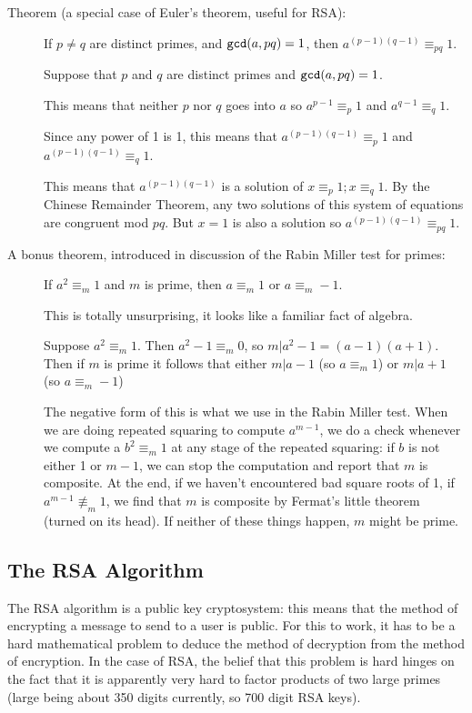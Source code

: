 \documentclass[12pt]{article}
\begin{document}
\begin{description}

\item[Theorem (a special case of Euler's theorem, useful for RSA):]  If $p \neq q$ are distinct primes,
and ${\tt gcd}(a,pq)=1$, then $a^{(p-1)(q-1)} \equiv_{pq} 1$.

Suppose that $p$ and $q$ are distinct primes and ${\tt gcd}(a,pq)=1$.  

This means that neither $p$ nor $q$ goes into $a$ so $a^{p-1} \equiv_p 1$ and $a^{q-1} \equiv_q 1$.

Since any power of 1 is 1, this means that $a^{(p-1)(q-1)} \equiv_{p} 1$ and $a^{(p-1)(q-1)} \equiv_{q} 1$.

This means that $a^{(p-1)(q-1)}$ is a solution of $x \equiv_p 1;x \equiv_q 1$.  By the Chinese Remainder Theorem,
any two solutions of this system of equations are congruent mod $pq$.  But $x=1$ is also a solution so
$a^{(p-1)(q-1)} \equiv_{pq} 1$.

\item[A bonus theorem, introduced in discussion of the Rabin Miller test for primes:]  If $a^2 \equiv_m 1$
and $m$ is prime, then $a \equiv_m 1$ or $a \equiv_m -1$.

This is totally unsurprising, it looks like a familiar fact of algebra.

Suppose $a^2 \equiv_m 1$.  Then $a^2-1 \equiv_m 0$, so $m|a^2-1 = (a-1)(a+1)$.  Then if $m$ is prime it follows
that either $m|a-1$ (so $a \equiv_m 1$) or $m|a+1$ (so $a \equiv_m -1$)

The negative form of this is what we use in the Rabin Miller test.  When we are doing repeated squaring to compute $a^{m-1}$, we do a 
check whenever we compute a $b^2 \equiv_m 1$ at any stage of the repeated squaring:  if $b$ is not either 1 or $m-1$, we can stop the computation and report that $m$ is composite.  At the end, if we haven't encountered bad square roots of 1,
if $a^{m-1}\not\equiv_m 1$, we find that $m$ is composite by Fermat's little theorem (turned on its head).  If neither
of these things happen, $m$ might be prime.


\end{description}

\subsection{The RSA Algorithm}

The RSA algorithm is a public key cryptosystem:  this means that the method of encrypting a message to send to a user is public.  For this to work, it has to be a hard mathematical problem to deduce the method of decryption from the method of encryption.  In the case of RSA, the belief that this problem is hard hinges on the fact that it is apparently very hard to factor products of two large primes (large being about 350 digits currently, so 700 digit RSA keys).
\end{document}
